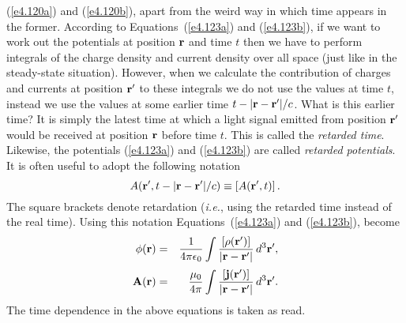  (\ref{e4.120a}) and (\ref{e4.120b}), apart from the weird way in which
time appears in the former. According to 
Equations~(\ref{e4.123a}) and (\ref{e4.123b}), if we want to work out the potentials
at position ${\bf r}$ and time $t$ then we have to perform integrals of  the charge density and current
density over all space (just like in the steady-state situation). However, when we calculate the
contribution of charges and currents at position ${\bf r}'$ to these integrals we do not use
the values at time $t$, instead we use the values at some earlier time
$t-|{\bf r} - {\bf r}'|/c$. What is this earlier time? It is simply the latest
time at which a light signal emitted from position ${\bf r}'$ would be received at position
${\bf r}$ before time $t$. This is called the {\em retarded time}. Likewise, the potentials
(\ref{e4.123a}) and (\ref{e4.123b}) are called {\em retarded potentials}. It is often useful to adopt the following notation
\begin{equation}
A({\bf r}', t- |{\bf r} - {\bf r}'|/c) \equiv \left[ A({\bf r}', t)\right].
\end{equation}
The square brackets denote retardation ({\em i.e.}, using the retarded time instead of the real time).
Using this notation Equations~(\ref{e4.123a}) and (\ref{e4.123b}), become
\begin{eqnarray}\label{e4.125a}
\phi({\bf r}) &=& \frac{1}{4\pi \epsilon_0} \int
\frac{\left[\rho({\bf r}')\right]}{|{\bf r} - {\bf r}'|}\,d^3{\bf r'},
\\[0.5ex]
{\bf A}({\bf r}) &=& \frac{\mu_0}{4\pi} \int
\frac{\left[{\bf j}({\bf r}')\right]}{|{\bf r} - {\bf r}'|}\,d^3{\bf r'}.\label{e4.125b}
\end{eqnarray}
The time dependence in the above equations is taken as read. 

